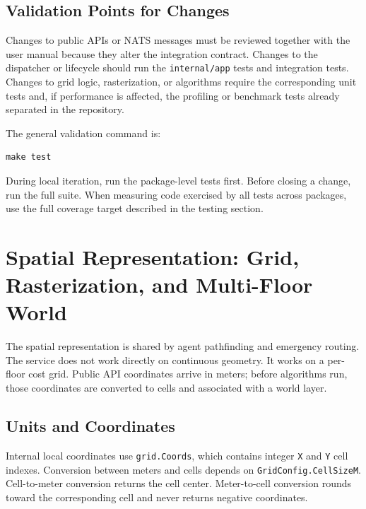 \documentclass[12pt,a4paper]{report}
\begin{document}
\subsection{Validation Points for Changes}

Changes to public APIs or NATS messages must be reviewed together with the user
manual because they alter the integration contract. Changes to the dispatcher or
lifecycle should run the \texttt{internal/app} tests and integration tests.
Changes to grid logic, rasterization, or algorithms require the corresponding
unit tests and, if performance is affected, the profiling or benchmark tests
already separated in the repository.

The general validation command is:

\begin{lstlisting}
make test
\end{lstlisting}

During local iteration, run the package-level tests first. Before closing a
change, run the full suite. When measuring code exercised by all tests across
packages, use the full coverage target described in the testing section.

\section{Spatial Representation: Grid, Rasterization, and Multi-Floor World}

The spatial representation is shared by agent pathfinding and emergency routing.
The service does not work directly on continuous geometry. It works on a
per-floor cost grid. Public API coordinates arrive in meters; before algorithms
run, those coordinates are converted to cells and associated with a world layer.

\subsection{Units and Coordinates}

Internal local coordinates use \texttt{grid.Coords}, which contains integer
\texttt{X} and \texttt{Y} cell indexes. Conversion between meters and cells
depends on \texttt{GridConfig.CellSizeM}. Cell-to-meter conversion returns the
cell center. Meter-to-cell conversion rounds toward the corresponding cell and
never returns negative coordinates.
\end{document}
